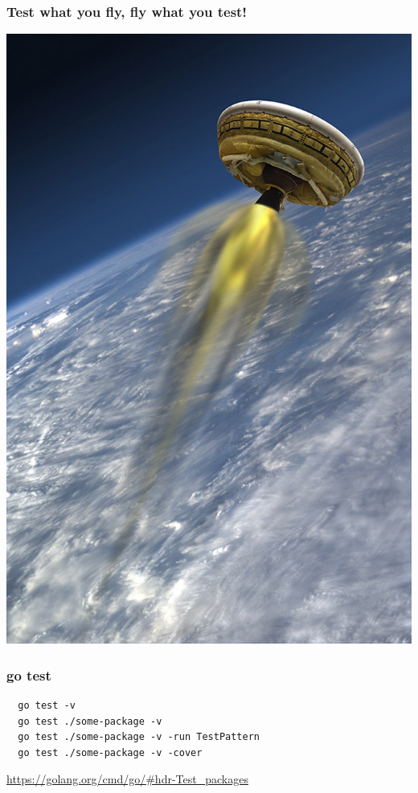 \documentclass[aspectratio=169]{beamer}
\begin{document}
\begin{frame}
  \frametitle{Test what you fly, fly what you test!}

  \includegraphics[scale=.35]{images/PIA18017_hires.jpg}

\end{frame}

\begin{frame}[fragile]
  \frametitle{go test}

\begin{verbatim}
  go test -v
  go test ./some-package -v
  go test ./some-package -v -run TestPattern
  go test ./some-package -v -cover
\end{verbatim}

  \url{https://golang.org/cmd/go/\#hdr-Test\_packages}

\end{frame}
\end{document}
